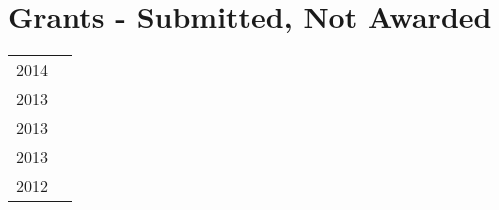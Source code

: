 \section*{Grants - Submitted, Not Awarded}
\begin{tabular}{L!{\VRule}R}
2014&\\
2013&\\
2013&\\
2013&\\
2012&\\
\end{tabular}